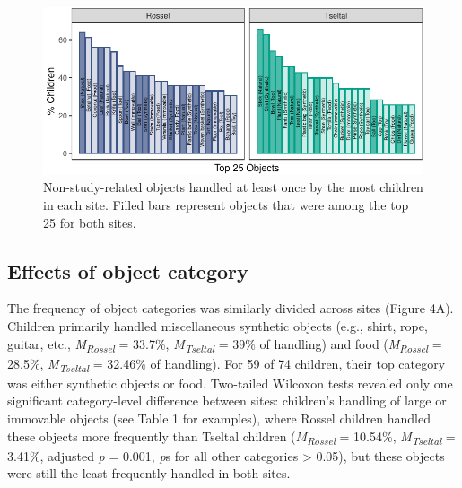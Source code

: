 \documentclass[10pt, letterpaper]{article}
\newenvironment{CodeChunk}{}{}
\begin{document}
\begin{CodeChunk}
\begin{figure}[!ht]

{\centering \includegraphics{figs/top-objects-fig-1} 

}

\caption[Non-study-related objects handled at least once by the most children in each site]{Non-study-related objects handled at least once by the most children in each site. Filled bars represent objects that were among the top 25 for both sites.}\label{fig:top-objects-fig}
\end{figure}
\end{CodeChunk}

\hypertarget{effects-of-object-category}{%
\subsection{Effects of object
category}\label{effects-of-object-category}}

The frequency of object categories was similarly divided across sites
(Figure 4A). Children primarily handled miscellaneous synthetic objects
(e.g., shirt, rope, guitar, etc., \emph{M}\textsubscript{\emph{Rossel}}
= 33.7\%, \emph{M}\textsubscript{\emph{Tseltal}} = 39\% of handling) and
food (\emph{M}\textsubscript{\emph{Rossel}} = 28.5\%,
\emph{M}\textsubscript{\emph{Tseltal}} = 32.46\% of handling). For 59 of
74 children, their top category was either synthetic objects or food.
Two-tailed Wilcoxon tests revealed only one significant category-level
difference between sites: children's handling of large or immovable
objects (see Table 1 for examples), where Rossel children handled these
objects more frequently than Tseltal children
(\emph{M}\textsubscript{\emph{Rossel}} = 10.54\%,
\emph{M}\textsubscript{\emph{Tseltal}} = 3.41\%, adjusted \emph{p} =
0.001, \emph{p}s for all other categories \textgreater{} 0.05), but
these objects were still the least frequently handled in both sites.
\end{document}
